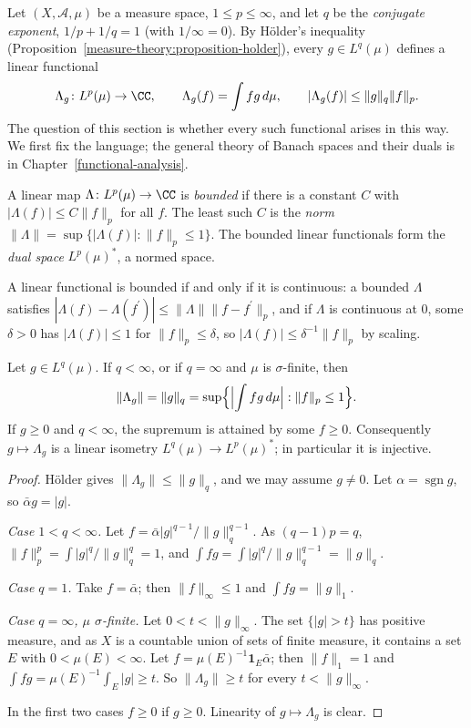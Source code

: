 Let $(X, \mathcal{A}, \mu)$ be a measure space, $1 \leq p \leq \infty$, and let $q$ be the \emph{conjugate exponent}, $1/p + 1/q = 1$ (with $1/\infty = 0$). By H\"older's inequality
(Proposition~\ref{measure-theory:proposition-holder}), every $g \in L^q(\mu)$ defines a linear functional
\[
\Lambda_g \colon L^p(\mu) \to \CC, \qquad \Lambda_g(f) = \int fg\,d\mu, \qquad |\Lambda_g(f)| \leq \|g\|_q\|f\|_p .
\]
The question of this section is whether every such functional arises in this way. We first fix the language; the general theory of Banach spaces and their duals is in
Chapter~\ref{functional-analysis}.

\begin{definition}\label{signed-measures:definition-bounded-functional}
A linear map $\Lambda \colon L^p(\mu) \to \CC$ is \emph{bounded} if there is a constant $C$ with $|\Lambda(f)| \leq C\|f\|_p$ for all $f$. The least such $C$ is the \emph{norm}
$\|\Lambda\| = \sup\{|\Lambda(f)| : \|f\|_p \leq 1\}$. The bounded linear functionals form the \emph{dual space} $L^p(\mu)^*$, a normed space.
\end{definition}

A linear functional is bounded if and only if it is continuous: a bounded $\Lambda$ satisfies $|\Lambda(f) - \Lambda(f^{\prime})| \leq \|\Lambda\|\|f - f^{\prime}\|_p$, and if $\Lambda$ is continuous at
$0$, some $\delta > 0$ has $|\Lambda(f)| \leq 1$ for $\|f\|_p \leq \delta$, so $|\Lambda(f)| \leq \delta^{-1}\|f\|_p$ by scaling.

\begin{proposition}\label{signed-measures:proposition-converse-holder}
Let $g \in L^q(\mu)$. If $q < \infty$, or if $q = \infty$ and $\mu$ is $\sigma$-finite, then
\[
\|\Lambda_g\| = \|g\|_q = \sup\Bigl\{\Bigl|\int fg\,d\mu\Bigr| : \|f\|_p \leq 1\Bigr\}.
\]
If $g \geq 0$ and $q < \infty$, the supremum is attained by some $f \geq 0$. Consequently $g \mapsto \Lambda_g$ is a linear isometry $L^q(\mu) \to L^p(\mu)^*$; in particular it is injective.
\end{proposition}

\begin{proof}
H\"older gives $\|\Lambda_g\| \leq \|g\|_q$, and we may assume $g \neq 0$. Let $\alpha = \operatorname{sgn}g$, so $\bar\alpha g = |g|$.

\emph{Case $1 < q < \infty$.} Let $f = \bar\alpha|g|^{q-1}/\|g\|_q^{q-1}$. As $(q - 1)p = q$, $\|f\|_p^p = \int|g|^q/\|g\|_q^q = 1$, and $\int fg = \int|g|^q/\|g\|_q^{q-1} = \|g\|_q$.

\emph{Case $q = 1$.} Take $f = \bar\alpha$; then $\|f\|_\infty \leq 1$ and $\int fg = \|g\|_1$.

\emph{Case $q = \infty$, $\mu$ $\sigma$-finite.} Let $0 < t < \|g\|_\infty$. The set $\{|g| > t\}$ has positive measure, and as $X$ is a countable union of sets of finite measure, it contains a set $E$
with $0 < \mu(E) < \infty$. Let $f = \mu(E)^{-1}\mathbf{1}_E\bar\alpha$; then $\|f\|_1 = 1$ and $\int fg = \mu(E)^{-1}\int_E|g| \geq t$. So $\|\Lambda_g\| \geq t$ for every $t < \|g\|_\infty$.

In the first two cases $f \geq 0$ if $g \geq 0$. Linearity of $g \mapsto \Lambda_g$ is clear.
\end{proof}

